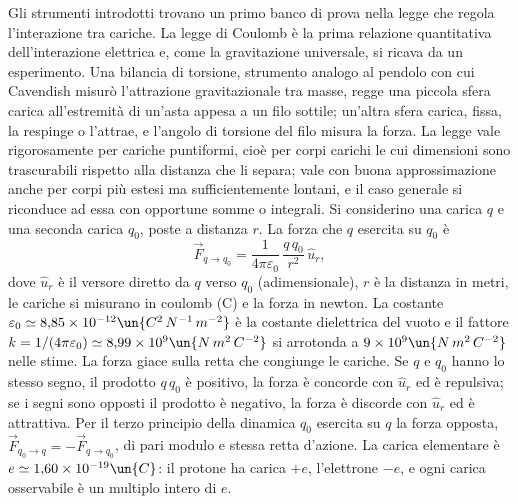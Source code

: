 \documentclass[main.tex]{subfiles}
\begin{document}
Gli strumenti introdotti trovano un primo banco di prova nella legge che regola l'interazione tra cariche. La legge di Coulomb è la prima relazione quantitativa dell'interazione elettrica e, come la gravitazione universale, si ricava da un esperimento. Una bilancia di torsione, strumento analogo al pendolo con cui Cavendish misurò l'attrazione gravitazionale tra masse, regge una piccola sfera carica all'estremità di un'asta appesa a un filo sottile; un'altra sfera carica, fissa, la respinge o l'attrae, e l'angolo di torsione del filo misura la forza. La legge vale rigorosamente per cariche puntiformi, cioè per corpi carichi le cui dimensioni sono trascurabili rispetto alla distanza che li separa; vale con buona approssimazione anche per corpi più estesi ma sufficientemente lontani, e il caso generale si riconduce ad essa con opportune somme o integrali. Si considerino una carica $q$ e una seconda carica $q_0$, poste a distanza $r$. La forza che $q$ esercita su $q_0$ è
\[
\vec F_{q\to q_0}=\frac{1}{4\pi\varepsilon_0}\,\frac{q\,q_0}{r^2}\,\hat u_r ,
\]
dove $\hat u_r$ è il versore diretto da $q$ verso $q_0$ (adimensionale), $r$ è la distanza in metri, le cariche si misurano in coulomb (C) e la forza in newton. La costante $\varepsilon_0\simeq8{,}85\times10^{-12}\un{C^2\,N^{-1}\,m^{-2}}$ è la costante dielettrica del vuoto e il fattore $k=1/(4\pi\varepsilon_0)\simeq8{,}99\times10^{9}\un{N\,m^2\,C^{-2}}$ si arrotonda a $9\times10^{9}\un{N\,m^2\,C^{-2}}$ nelle stime. La forza giace sulla retta che congiunge le cariche. Se $q$ e $q_0$ hanno lo stesso segno, il prodotto $q\,q_0$ è positivo, la forza è concorde con $\hat u_r$ ed è repulsiva; se i segni sono opposti il prodotto è negativo, la forza è discorde con $\hat u_r$ ed è attrattiva. Per il terzo principio della dinamica $q_0$ esercita su $q$ la forza opposta, $\vec F_{q_0\to q}=-\vec F_{q\to q_0}$, di pari modulo e stessa retta d'azione. La carica elementare è $e\simeq1{,}60\times10^{-19}\un{C}$: il protone ha carica $+e$, l'elettrone $-e$, e ogni carica osservabile è un multiplo intero di $e$.
\end{document}
